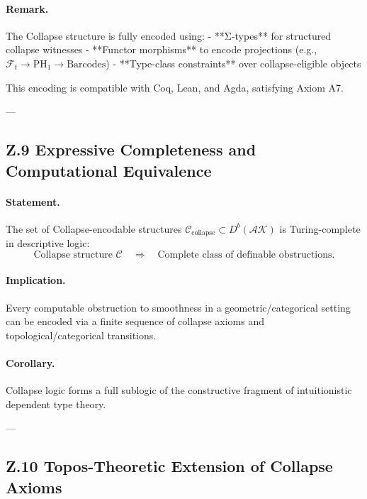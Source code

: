 \documentclass[11pt]{article}
\begin{document}
\paragraph{Remark.}
The Collapse structure is fully encoded using:
- **Σ-types** for structured collapse witnesses
- **Functor morphisms** to encode projections (e.g., \( \mathcal{F}_t \to \mathrm{PH}_1 \to \text{Barcodes} \))
- **Type-class constraints** over collapse-eligible objects

This encoding is compatible with Coq, Lean, and Agda, satisfying Axiom A7.

---

\subsection*{Z.9 Expressive Completeness and Computational Equivalence}

\paragraph{Statement.}
The set of Collapse-encodable structures \( \mathcal{C}_{\text{collapse}} \subset D^b(\mathcal{AK}) \) is Turing-complete in descriptive logic:
\[
\text{Collapse structure } \mathcal{C} \quad \Longrightarrow \quad \text{Complete class of definable obstructions}.
\]

\paragraph{Implication.}
Every computable obstruction to smoothness in a geometric/categorical setting  
can be encoded via a finite sequence of collapse axioms and topological/categorical transitions.

\paragraph{Corollary.}
Collapse logic forms a full sublogic of the constructive fragment of intuitionistic dependent type theory.

---

\subsection*{Z.10 Topos-Theoretic Extension of Collapse Axioms}
\end{document}
